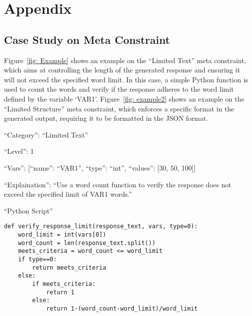 \appendix


\section{Appendix}
\label{sec:appendix}

\subsection{Case Study on Meta Constraint}
Figure~\ref{fig: Example} shows an example on the ``Limited Text'' meta constraint, which aims at controlling the length of the generated response and ensuring it will not exceed the specified word limit.  In this case, a simple Python function is used to count the words and verify if the response adheres to the word limit defined by the variable `VAR1'. 
Figure~\ref{fig: example2} shows an example on the ``Limited Structure'' meta constraint, which enforces a specific format in the generated output, requiring it to be formatted in the JSON format.


\begin{figure*}[t!]
\centering
\begin{tcolorbox}[colback=gray!00,%
                  colframe=black,%
                  width=16cm,%
                  arc=1.5mm, auto outer arc,
                  left=0.9mm, right=0.9mm,
                  boxrule=0.9pt, colbacktitle = black!65!black
                 ]
 ``Category'': ``Limited Text''

 ``Level'': 1

  ``Vars'': [{``name'': ``VAR1'', ``type'': ``int'', ``values'': [30, 50, 100]}]

 ``Explaination'': ``Use a word count function to verify the response does not exceed the specified limit of VAR1 words.''

 ``Python Script''
\begin{verbatim}
def verify_response_limit(response_text, vars, type=0):
    word_limit = int(vars[0])
    word_count = len(response_text.split())
    meets_criteria = word_count <= word_limit
    if type==0:
        return meets_criteria
    else:
        if meets_criteria:
            return 1
        else:
            return 1-(word_count-word_limit)/word_limit
\end{verbatim}


\end{tcolorbox}
\caption{Example of a Limited Text category meta constraint.}
\label{fig: Example}
\end{figure*}






